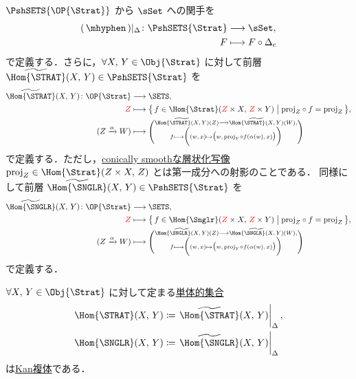 \documentclass[TQFT_main]{subfiles}
\begin{document}
$\PshSETS{\OP{\Strat}}$ から $\sSet$ への関手を
\begin{align}
    (\, \mhyphen \,)|_{\Delta} \colon \PshSETS{\Strat} &\lto \sSet, \\
    F &\lmto F \circ \Delta_e
\end{align}
で定義する．さらに，$\forall X,\, Y \in \Obj{\Strat}$ に対して前層 $\widetilde{\Hom{\STRAT}} (X,\, Y) \in \PshSETS{\Strat}$ を
\begin{align}
    \widetilde{\Hom{\STRAT}} (X,\, Y) \colon \OP{\Strat} &\lto \SETS, \\
    \textcolor{red}{Z} &\lmto \bigl\{\, f \in \Hom{\Strat}(\textcolor{red}{Z} \times X,\, \textcolor{red}{Z} \times Y) \bigm| \mathrm{proj}_Z \circ f = \mathrm{proj}_Z \,\bigr\}, \\
    (Z \xrightarrow{\alpha} W) &\lmto \Biggl(\substack{\widetilde{\Hom{\STRAT}(X,\, Y)}(Z) \lto \widetilde{\Hom{\STRAT}(X,\, Y)}(W), \\ f \lmto \biggl((w,\, x) \mapsto \bigl(w,\, \mathrm{proj}_Y \circ f (\alpha(w),\, x)\bigr)\biggr)}\Biggr)
\end{align}
で定義する．ただし，\hyperref[def:c-smooth-map]{conically smoothな層状化写像} $\mathrm{proj}_Z \in \Hom{\Strat}(Z \times X,\, Z)$ とは第一成分への射影のことである．
同様にして前層 $\widetilde{\Hom{\SNGLR}} (X,\, Y) \in \PshSETS{\Strat}$ を
\begin{align}
    \widetilde{\Hom{\SNGLR}} (X,\, Y) \colon \OP{\Strat} &\lto \SETS, \\
    \textcolor{red}{Z} &\lmto \bigl\{\, f \in \Hom{\Snglr}(\textcolor{red}{Z} \times X,\, \textcolor{red}{Z} \times Y) \bigm| \mathrm{proj}_Z \circ f = \mathrm{proj}_Z \,\bigr\}, \\
    (Z \xrightarrow{\alpha} W) &\lmto \Biggl(\substack{\widetilde{\Hom{\SNGLR}(X,\, Y)}(Z) \lto \widetilde{\Hom{\SNGLR}(X,\, Y)}(W), \\ f \lmto \biggl((w,\, x) \mapsto \bigl(w,\, \mathrm{proj}_Y \circ f (\alpha(w),\, x)\bigr)\biggr)}\Biggr)
\end{align}
で定義する．

\begin{mylem}[label=lem:Kan-enriched]{}
    $\forall X,\, Y \in \Obj{\Strat}$ に対して定まる\hyperref[def:SimpSet]{単体的集合}
    \begin{align}
        \Hom{\STRAT}(X,\, Y) &\coloneqq \eval{\widetilde{\Hom{\STRAT}}(X,\, Y)}_{\Delta}, \\
        \Hom{\SNGLR}(X,\, Y) &\coloneqq \eval{\widetilde{\Hom{\SNGLR}}(X,\, Y)}_{\Delta}
    \end{align}
    は\hyperref[def:KanCplx]{Kan複体}である．
\end{mylem}
\end{document}
